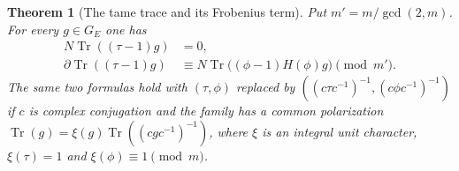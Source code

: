 \documentclass[a4paper,11pt]{article}
\newtheorem{theorem}[proposition]{Theorem}
\theoremstyle{definition}
\theoremstyle{remark}
\numberwithin{equation}{section}
\begin{document}
\begin{theorem}[The tame trace and its Frobenius term]
\leavevmode\label{thm:tametransfer721}
Put \(m'=m/\gcd(2,m)\). For every \(g\in G_E\) one has
\[
 \begin{split}
        N\operatorname{Tr}((\tau-1)g)&=0,\\
 \partial\operatorname{Tr}((\tau-1)g)&\equiv
        N\operatorname{Tr}\bigl((\phi-1)H(\phi)g\bigr)
                                                   \pmod {m'} .
 \end{split}
\]
The same two formulas hold with \((\tau,\phi)\) replaced by
\(((c\tau c^{-1})^{-1},(c\phi c^{-1})^{-1})\) if \(c\) is
complex conjugation and the family has a common polarization
\(\operatorname{Tr}(g)=\xi(g)\operatorname{Tr}((cgc^{-1})^{-1})\),
where \(\xi\) is an integral unit character, \(\xi(\tau)=1\)
and \(\xi(\phi)\equiv1\pmod m\).
\end{theorem}
\end{document}
